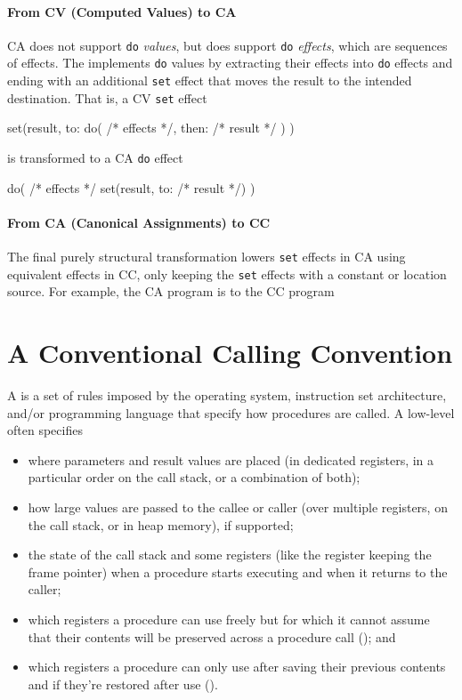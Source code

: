 \documentclass[main.tex]{subfiles}
\begin{document}
\paragraph{From CV (Computed Values) to CA} CA does not support \texttt{do} \emph{values}, but does support \texttt{do} \emph{effects}, which are sequences of effects. The  implements \texttt{do} values by extracting their effects into \texttt{do} effects and ending with an additional \texttt{set} effect that moves the result to the intended destination. That is, a CV \texttt{set} effect
\begin{il}
	set(result, to:
		do(
			/* effects */,
			then: /* result */
		)
	)
\end{il}
is transformed to a CA \texttt{do} effect
\begin{il}
	do(
		/* effects */
		set(result, to: /* result */)
	)
\end{il}

\paragraph{From CA (Canonical Assignments) to CC} The final purely structural transformation lowers \texttt{set} effects in CA using equivalent effects in CC, only keeping the \texttt{set} effects with a constant or location source. For example, the CA program
is \lowered{} to the CC program

\section{A Conventional Calling Convention} \label{sct:cc}
A  is a set of rules imposed by the operating system, instruction set architecture, and/or programming language that specify how procedures are called. A low-level  often specifies
\begin{itemize}[noitemsep]
	\item where parameters and result values are placed (in dedicated registers, in a particular order on the call stack, or a combination of both);
	\item how large values are passed to the callee or caller (over multiple registers, on the call stack, or in heap memory), if supported;
	\item the state of the call stack and some registers (like the register keeping the frame pointer) when a procedure starts executing and when it returns to the caller;
	\item which registers a procedure can use freely but for which it cannot assume that their contents will be preserved across a procedure call (\textbf{}); and
	\item which registers a procedure can only use after saving their previous contents and if they're restored after use (\textbf{}).
\end{itemize}
\end{document}
